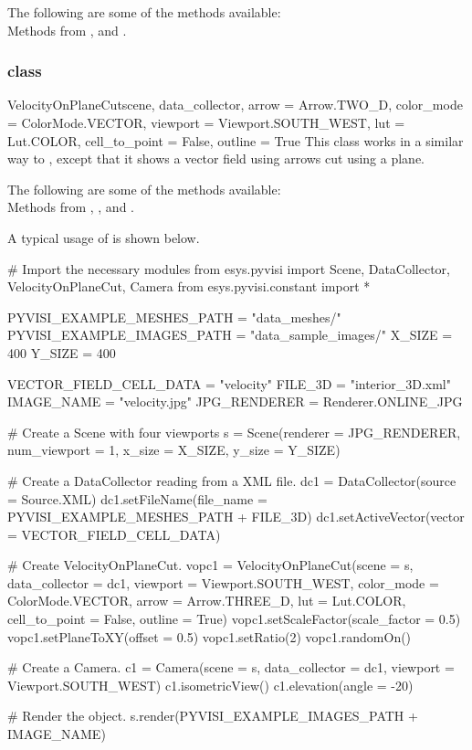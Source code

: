 The following are some of the methods available:\\
Methods from \ActorThreeD, \GlyphThreeD and \MaskPoints. 

\subsubsection{\VelocityOnPlaneCut class}

\begin{classdesc}{VelocityOnPlaneCut}{scene, data_collector,
arrow = Arrow.TWO_D, color_mode = ColorMode.VECTOR, 
viewport = Viewport.SOUTH_WEST, lut = Lut.COLOR, 
cell_to_point = False, outline = True}
This class works in a similar way to \MapOnPlaneCut, except that 
it shows a vector field using arrows cut using a plane.
\end{classdesc}

The following are some of the methods available:\\
Methods from \ActorThreeD, \GlyphThreeD, \Transform and \MaskPoints. 

A typical usage of \VelocityOnPlaneCut is shown below.

\begin{python}
# Import the necessary modules
from esys.pyvisi import Scene, DataCollector, VelocityOnPlaneCut, Camera
from esys.pyvisi.constant import *

PYVISI_EXAMPLE_MESHES_PATH = "data_meshes/"
PYVISI_EXAMPLE_IMAGES_PATH = "data_sample_images/"
X_SIZE = 400
Y_SIZE = 400

VECTOR_FIELD_CELL_DATA = "velocity"
FILE_3D = "interior_3D.xml"
IMAGE_NAME = "velocity.jpg"
JPG_RENDERER = Renderer.ONLINE_JPG


# Create a Scene with four viewports
s = Scene(renderer = JPG_RENDERER, num_viewport = 1, x_size = X_SIZE, 
        y_size = Y_SIZE)

# Create a DataCollector reading from a XML file.
dc1 = DataCollector(source = Source.XML)
dc1.setFileName(file_name = PYVISI_EXAMPLE_MESHES_PATH + FILE_3D)
dc1.setActiveVector(vector = VECTOR_FIELD_CELL_DATA)

# Create VelocityOnPlaneCut.
vopc1 = VelocityOnPlaneCut(scene = s, data_collector = dc1, 
        viewport = Viewport.SOUTH_WEST, color_mode = ColorMode.VECTOR, 
        arrow = Arrow.THREE_D, lut = Lut.COLOR, cell_to_point = False, 
        outline = True)
vopc1.setScaleFactor(scale_factor = 0.5)
vopc1.setPlaneToXY(offset = 0.5)
vopc1.setRatio(2)
vopc1.randomOn()

# Create a Camera.
c1 = Camera(scene = s, data_collector = dc1, viewport = Viewport.SOUTH_WEST)
c1.isometricView()
c1.elevation(angle = -20)

# Render the object.
s.render(PYVISI_EXAMPLE_IMAGES_PATH + IMAGE_NAME)
\end{python}

